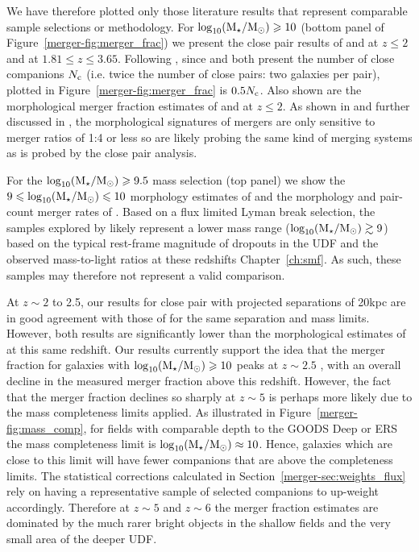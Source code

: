 We have therefore plotted only those literature results that represent comparable sample selections or methodology. For $\log_{10}(\text{M}_{\star} / \text{M}_{\odot}) \geqslant 10$ (bottom panel of Figure~\ref{merger-fig:merger_frac}) we present the close pair results of \citet{RyanJr:2008ka} and \citet{LopezSanjuan:2010cz} at $z\leq2$ and \citet{Tasca:2014gz} at $1.81 \leq z \leq 3.65$. Following , since \citet{RyanJr:2008ka} and \citet{LopezSanjuan:2010cz} both present the number of close companions $N_{\rm{c}}$ (i.e. twice the number of close pairs: two galaxies per pair), plotted in Figure~\ref{merger-fig:merger_frac} is $0.5 N_{\rm{c}}$. Also shown are the morphological merger fraction estimates of \citet{Conselice:2008de} and \citet{Conselice:2009fe} at $z \leq 2$. As shown in \citet{Lotz:2008kr} and further discussed in \citet{Bluck:2012dh}, the morphological signatures of mergers are only sensitive to merger ratios of 1:4 or less so are likely probing the same kind of merging systems as is probed by the close pair analysis.

For the $\log_{10}(\text{M}_{\star} / \text{M}_{\odot}) \geqslant 9.5$ mass selection (top panel) we show the $9 \leqslant \log_{10}(\text{M}_{\star} / \text{M}_{\odot}) \leqslant 10$ morphology estimates of \citet{Conselice:2008de} and the morphology and pair-count merger rates of \citet{2009MNRAS.397..208C}. Based on a flux limited Lyman break selection, the samples explored by \citet{2009MNRAS.397..208C} likely represent a lower mass range ($\log_{10}(\text{M}_{\star} / \text{M}_{\odot}) \gtrsim 9$) based on the typical rest-frame magnitude of dropouts in the UDF and the observed mass-to-light ratios at these redshifts Chapter~\ref{ch:smf}. As such, these samples may therefore not represent a valid comparison. 

At $z\sim2$ to 2.5, our results for close pair with projected separations of 20kpc are in good agreement with those of \citet{RyanJr:2008ka} for the same separation and mass limits. However, both results are significantly lower than the morphological estimates of \citet{Conselice:2008de} at this same redshift. Our results currently support the idea that the merger fraction for galaxies with $\log_{10}(\text{M}_{\star} / \text{M}_{\odot}) \geqslant 10$ peaks at $z\sim2.5$ \citep{Conselice:2014ct}, with an overall decline in the measured merger fraction above this redshift. However, the fact that the merger fraction declines so sharply at $z\sim5$ is perhaps more likely due to the mass completeness limits applied. As illustrated in Figure~\ref{merger-fig:mass_comp}, for fields with comparable depth to the GOODS Deep or ERS the mass completeness limit is $\log_{10}(\text{M}_{\star} / \text{M}_{\odot}) \approx 10$. Hence, galaxies which are close to this limit will have fewer companions that are above the completeness limits. The statistical corrections calculated in Section~\ref{merger-sec:weights_flux} rely on having a representative sample of selected companions to up-weight accordingly. Therefore at $z\sim5$ and $z\sim6$ the merger fraction estimates are dominated by the much rarer bright objects in the shallow fields and the very small area of the deeper UDF.

